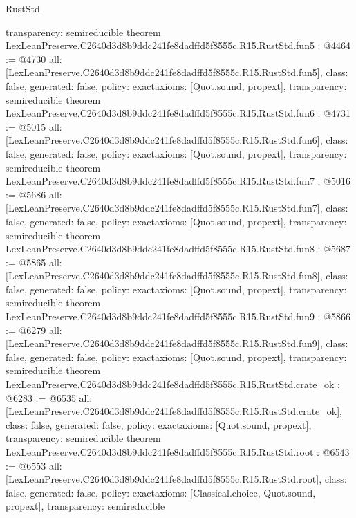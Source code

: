 \begin{lexlean}{RustStd}
\begin{coremodule}
{  transparency: semireducible
}
theorem LexLeanPreserve.C2640d3d8b9ddc241fe8dadffd5f8555c.R15.RustStd.fun5 : @4464 := @4730 {
  all: [LexLeanPreserve.C2640d3d8b9ddc241fe8dadffd5f8555c.R15.RustStd.fun5],
  class: false,
  generated: false,
  policy: exact{axioms: [Quot.sound, propext]},
  transparency: semireducible
}
theorem LexLeanPreserve.C2640d3d8b9ddc241fe8dadffd5f8555c.R15.RustStd.fun6 : @4731 := @5015 {
  all: [LexLeanPreserve.C2640d3d8b9ddc241fe8dadffd5f8555c.R15.RustStd.fun6],
  class: false,
  generated: false,
  policy: exact{axioms: [Quot.sound, propext]},
  transparency: semireducible
}
theorem LexLeanPreserve.C2640d3d8b9ddc241fe8dadffd5f8555c.R15.RustStd.fun7 : @5016 := @5686 {
  all: [LexLeanPreserve.C2640d3d8b9ddc241fe8dadffd5f8555c.R15.RustStd.fun7],
  class: false,
  generated: false,
  policy: exact{axioms: [Quot.sound, propext]},
  transparency: semireducible
}
theorem LexLeanPreserve.C2640d3d8b9ddc241fe8dadffd5f8555c.R15.RustStd.fun8 : @5687 := @5865 {
  all: [LexLeanPreserve.C2640d3d8b9ddc241fe8dadffd5f8555c.R15.RustStd.fun8],
  class: false,
  generated: false,
  policy: exact{axioms: [Quot.sound, propext]},
  transparency: semireducible
}
theorem LexLeanPreserve.C2640d3d8b9ddc241fe8dadffd5f8555c.R15.RustStd.fun9 : @5866 := @6279 {
  all: [LexLeanPreserve.C2640d3d8b9ddc241fe8dadffd5f8555c.R15.RustStd.fun9],
  class: false,
  generated: false,
  policy: exact{axioms: [Quot.sound, propext]},
  transparency: semireducible
}
theorem LexLeanPreserve.C2640d3d8b9ddc241fe8dadffd5f8555c.R15.RustStd.crate_ok : @6283 := @6535 {
  all: [LexLeanPreserve.C2640d3d8b9ddc241fe8dadffd5f8555c.R15.RustStd.crate_ok],
  class: false,
  generated: false,
  policy: exact{axioms: [Quot.sound, propext]},
  transparency: semireducible
}
theorem LexLeanPreserve.C2640d3d8b9ddc241fe8dadffd5f8555c.R15.RustStd.root : @6543 := @6553 {
  all: [LexLeanPreserve.C2640d3d8b9ddc241fe8dadffd5f8555c.R15.RustStd.root],
  class: false,
  generated: false,
  policy: exact{axioms: [Classical.choice, Quot.sound, propext]},
  transparency: semireducible
}


\end{coremodule}
\end{lexlean}
